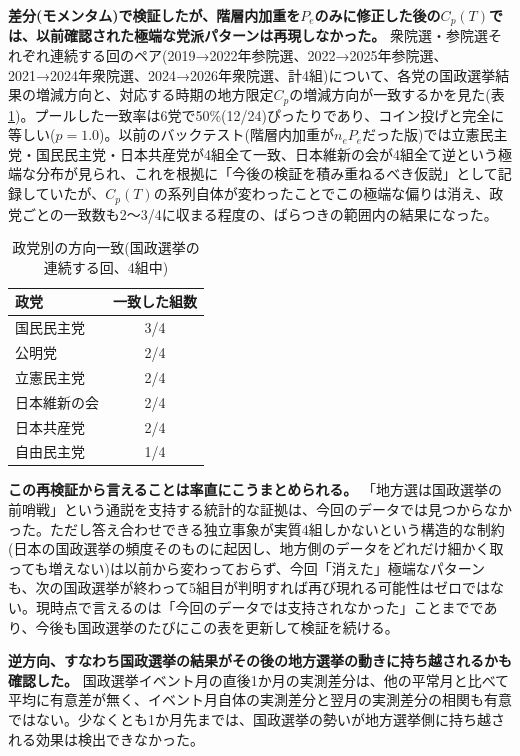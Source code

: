 \documentclass[a4paper,11pt]{ltjsarticle}
\begin{document}
\textbf{差分(モメンタム)で検証したが、階層内加重を$P_e$のみに修正した後の$C_p(T)$では、以前確認された極端な党派パターンは再現しなかった。} 衆院選・参院選それぞれ連続する回のペア(2019→2022年参院選、2022→2025年参院選、2021→2024年衆院選、2024→2026年衆院選、計4組)について、各党の国政選挙結果の増減方向と、対応する時期の地方限定$C_p$の増減方向が一致するかを見た(表\ref{tab:local-momentum})。プールした一致率は6党で50\%(12/24)ぴったりであり、コイン投げと完全に等しい($p=1.0$)。以前のバックテスト(階層内加重が$n_eP_e$だった版)では立憲民主党・国民民主党・日本共産党が4組全て一致、日本維新の会が4組全て逆という極端な分布が見られ、これを根拠に「今後の検証を積み重ねるべき仮説」として記録していたが、$C_p(T)$の系列自体が変わったことでこの極端な偏りは消え、政党ごとの一致数も2〜3/4に収まる程度の、ばらつきの範囲内の結果になった。

\begin{table}[h]
\centering
\small
\caption{政党別の方向一致(国政選挙の連続する回、4組中)}
\label{tab:local-momentum}
\begin{tabular}{lc}
\toprule
政党 & 一致した組数 \\
\midrule
国民民主党 & 3/4 \\
公明党 & 2/4 \\
立憲民主党 & 2/4 \\
日本維新の会 & 2/4 \\
日本共産党 & 2/4 \\
自由民主党 & 1/4 \\
\bottomrule
\end{tabular}
\end{table}

\textbf{この再検証から言えることは率直にこうまとめられる。} 「地方選は国政選挙の前哨戦」という通説を支持する統計的な証拠は、今回のデータでは見つからなかった。ただし答え合わせできる独立事象が実質4組しかないという構造的な制約(日本の国政選挙の頻度そのものに起因し、地方側のデータをどれだけ細かく取っても増えない)は以前から変わっておらず、今回「消えた」極端なパターンも、次の国政選挙が終わって5組目が判明すれば再び現れる可能性はゼロではない。現時点で言えるのは「今回のデータでは支持されなかった」ことまでであり、今後も国政選挙のたびにこの表を更新して検証を続ける。

\textbf{逆方向、すなわち国政選挙の結果がその後の地方選挙の動きに持ち越されるかも確認した。} 国政選挙イベント月の直後1か月の実測差分は、他の平常月と比べて平均に有意差が無く、イベント月自体の実測差分と翌月の実測差分の相関も有意ではない。少なくとも1か月先までは、国政選挙の勢いが地方選挙側に持ち越される効果は検出できなかった。
\end{document}
